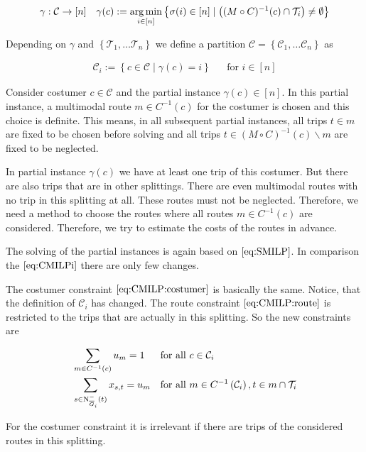 \begin{align*}
	\gamma: \mathcal{C}\to[n] && \gamma(c):=\operatorname*{arg\,min}_{i\in[n]}\left\{\sigma(i)\in[n]\mid \left((M\circ C)^{-1}(c)\cap\mathcal{T}_i\right)\neq\emptyset\right\}
\end{align*}

Depending on $\gamma$ and $\left\{\mathcal{T}_1,\dots\mathcal{T}_n\right\}$ we define a partition $\mathcal{C}=\left\{\mathcal{C}_1,\dots\mathcal{C}_n\right\}$ as

\begin{align*}
	\mathcal{C}_i := \left\{c\in\mathcal{C}\mid \gamma(c)=i\right\} && \text{for } i\in[n]
\end{align*}

Consider costumer $c\in\mathcal{C}$ and the partial instance $\gamma(c)\in[n]$. In this partial instance, a multimodal route $m\in C^{-1}(c)$ for the costumer is chosen and this choice is definite. This means, in all subsequent partial instances, all trips $t\in m$ are fixed to be chosen before solving and all trips $t\in(M\circ C)^{-1}(c)\backslash m$ are fixed to be neglected.

In partial instance $\gamma(c)$ we have at least one trip of this costumer. But there are also trips that are in other splittings. There are even multimodal routes with no trip in this splitting at all. These routes must not be neglected. Therefore, we need a method to choose the routes where all routes $m\in C^{-1}(c)$ are considered. Therefore, we try to estimate the costs of the routes in advance.

The solving of the partial instances is again based on $\eqref{eq:SMILP}$. In comparison the $\eqref{eq:CMILPi}$ there are only few changes. 

The costumer constraint $\eqref{eq:CMILP:costumer}$ is basically the same. Notice, that the definition of $\mathcal{C}_i$ has changed. The route constraint $\eqref{eq:CMILP:route}$ is restricted to the trips that are actually in this splitting. So the new constraints are

\begin{align}
	&\sum_{m\in C^{-1}(c)} u_m = 1 && \text{for all } c\in\mathcal{C}_i \label{eq:TMILP:costumer} \\
	&\sum_{s\in\operatorname{N}_{\overline{G}_i}^-(t)} x_{s,t} = u_m && \text{for all } m\in C^{-1}\left(\mathcal{C}_i\right), t\in m\cap\mathcal{T}_i \label{eq:TMILP:route}
\end{align}

For the costumer constraint it is irrelevant if there are trips of the considered routes in this splitting.

